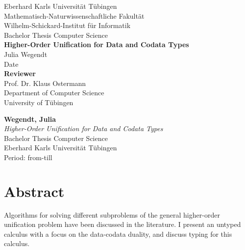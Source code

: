 \documentclass[twoside,12pt,a4paper]{article}
\begin{document}
\begin{titlepage}
 \begin{center}
  {\LARGE Eberhard Karls Universität Tübingen}\\
  {\large Mathematisch-Naturwissenschaftliche Fakultät \\
Wilhelm-Schickard-Institut für Informatik\\[4cm]}
  {\huge Bachelor Thesis Computer Science\\[2cm]}
  {\Large\bf  Higher-Order Unification for Data and Codata Types\\[1.5cm]}
 {\large Julia Wegendt}\\[0.5cm]
Date\\[3cm]
{\small\bf Reviewer}\\[0.5cm]
 {\large Prof. Dr. Klaus Ostermann}\\
  {\footnotesize Department of Computer Science\\
	University of Tübingen}
\end{center}
	
\end{titlepage}

\thispagestyle{empty}
\vspace*{\fill}
\begin{minipage}{11.2cm}
\textbf{Wegendt, Julia}\\
\emph{Higher-Order Unification for Data and Codata Types}\\ Bachelor Thesis Computer Science\\
Eberhard Karls Universität Tübingen\\
Period: from-till
\end{minipage}
\newpage


\setcounter{page}{1}


\section*{Abstract}

Algorithms for solving different subproblems of the general higher-order unification problem have been discussed in the literature.
I present an untyped calculus with a focus on the data-codata duality, 
and discuss typing for this calculus.
\end{document}
